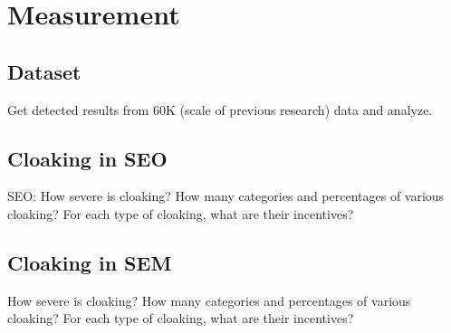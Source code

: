 \section{Measurement}
\label{s:measurement}

\subsection{Dataset}
Get detected results from 60K (scale of previous research) data and analyze. 

\subsection{Cloaking in SEO}

SEO: How severe is cloaking? How many categories and percentages of various
cloaking? For each type of cloaking, what are their incentives?



\subsection{Cloaking in SEM}

How severe is cloaking? How many categories and percentages of various cloaking?
For each type of cloaking, what are their incentives?


